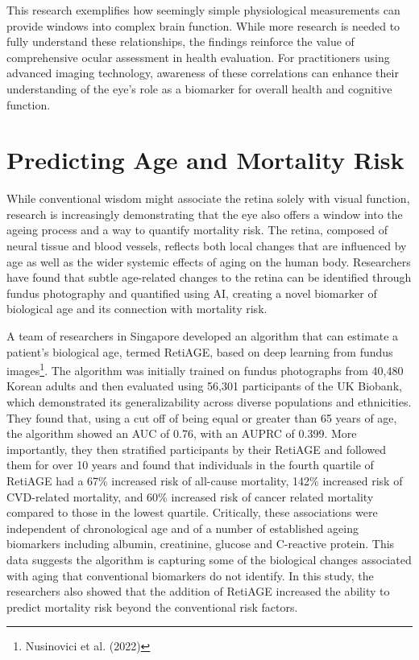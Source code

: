 \documentclass[
  Letterpaper,
]{scrbook}
\begin{document}
This research exemplifies how seemingly simple physiological
measurements can provide windows into complex brain function. While more
research is needed to fully understand these relationships, the findings
reinforce the value of comprehensive ocular assessment in health
evaluation. For practitioners using advanced imaging technology,
awareness of these correlations can enhance their understanding of the
eye's role as a biomarker for overall health and cognitive function.

\section{Predicting Age and Mortality
Risk}\label{predicting-age-and-mortality-risk}

While conventional wisdom might associate the retina solely with visual
function, research is increasingly demonstrating that the eye also
offers a window into the ageing process and a way to quantify mortality
risk. The retina, composed of neural tissue and blood vessels, reflects
both local changes that are influenced by age as well as the wider
systemic effects of aging on the human body. Researchers have found that
subtle age-related changes to the retina can be identified through
fundus photography and quantified using AI, creating a novel biomarker
of biological age and its connection with mortality risk.

A team of researchers in Singapore developed an algorithm that can
estimate a patient's biological age, termed RetiAGE, based on deep
learning from fundus images\footnote{Nusinovici et al. (2022)}. The
algorithm was initially trained on fundus photographs from 40,480 Korean
adults and then evaluated using 56,301 participants of the UK Biobank,
which demonstrated its generalizability across diverse populations and
ethnicities. They found that, using a cut off of being equal or greater
than 65 years of age, the algorithm showed an AUC of 0.76, with an AUPRC
of 0.399. More importantly, they then stratified participants by their
RetiAGE and followed them for over 10 years and found that individuals
in the fourth quartile of RetiAGE had a 67\% increased risk of all-cause
mortality, 142\% increased risk of CVD-related mortality, and 60\%
increased risk of cancer related mortality compared to those in the
lowest quartile. Critically, these associations were independent of
chronological age and of a number of established ageing biomarkers
including albumin, creatinine, glucose and C-reactive protein. This data
suggests the algorithm is capturing some of the biological changes
associated with aging that conventional biomarkers do not identify. In
this study, the researchers also showed that the addition of RetiAGE
increased the ability to predict mortality risk beyond the conventional
risk factors.
\end{document}
